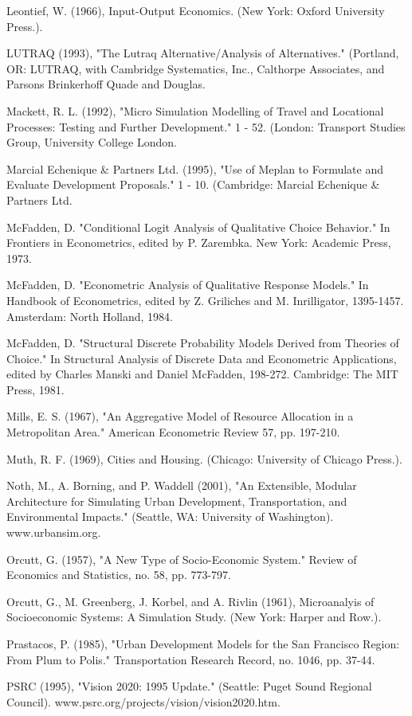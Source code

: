 Leontief, W. (1966), Input-Output Economics. (New York: Oxford University Press.).

LUTRAQ (1993), "The Lutraq Alternative/Analysis of Alternatives." (Portland, OR: LUTRAQ, with Cambridge Systematics, Inc., Calthorpe Associates, and Parsons Brinkerhoff Quade and Douglas.

Mackett, R. L. (1992), "Micro Simulation Modelling of Travel and Locational Processes: Testing and Further Development." 1 - 52. (London: Transport Studies Group, University College London.

Marcial Echenique \& Partners Ltd. (1995), "Use of Meplan to Formulate and Evaluate Development Proposals." 1 - 10. (Cambridge: Marcial Echenique \& Partners Ltd.

McFadden, D. "Conditional Logit Analysis of Qualitative Choice Behavior." In Frontiers in Econometrics, edited by P. Zarembka. New York: Academic Press, 1973.

McFadden, D. "Econometric Analysis of Qualitative Response Models." In Handbook of Econometrics, edited by Z. Griliches and M. Inrilligator, 1395-1457. Amsterdam: North Holland, 1984.

McFadden, D. "Structural Discrete Probability Models Derived from Theories of Choice." In Structural Analysis of Discrete Data and Econometric Applications, edited by Charles Manski and Daniel McFadden, 198-272. Cambridge: The MIT Press, 1981.

Mills, E. S. (1967), "An Aggregative Model of Resource Allocation in a Metropolitan Area." American Econometric Review 57, pp. 197-210.

Muth, R. F. (1969), Cities and Housing. (Chicago: University of Chicago Press.).

Noth, M., A. Borning, and P. Waddell (2001), "An Extensible, Modular Architecture for Simulating Urban Development, Transportation, and Environmental Impacts." (Seattle, WA: University of Washington). www.urbansim.org.

Orcutt, G. (1957), "A New Type of Socio-Economic System." Review of Economics and Statistics, no. 58, pp. 773-797.

Orcutt, G., M. Greenberg, J. Korbel, and A. Rivlin (1961), Microanalyis of Socioeconomic Systems: A Simulation Study. (New York: Harper and Row.).

Prastacos, P. (1985), "Urban Development Models for the San Francisco Region: From Plum to Polis." Transportation Research Record, no. 1046, pp. 37-44.

PSRC (1995), "Vision 2020: 1995 Update." (Seattle: Puget Sound Regional Council). www.psrc.org/projects/vision/vision2020.htm.

